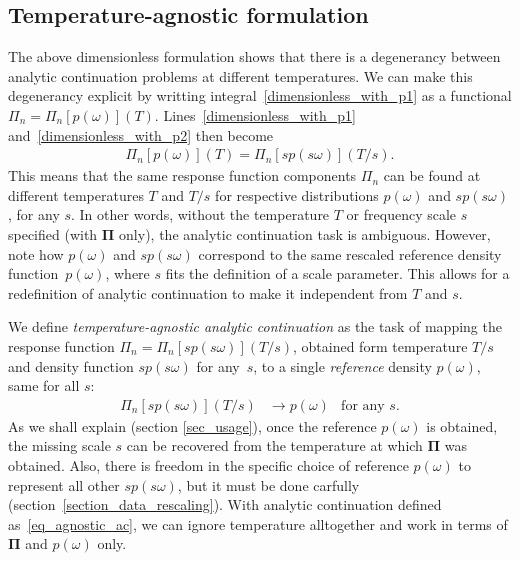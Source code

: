 \documentclass[notitlepage,11pt,nofootinbib]{revtex4-1}
\renewcommand{\vec}[1]{\bm{#1}}
\begin{document}
\subsection{Temperature-agnostic formulation}
\label{section_temperature_agnostic}
The above dimensionless  formulation shows that there is a degenerancy between analytic continuation problems at different temperatures. We can make this degenerancy explicit by writting integral~\eqref{dimensionless_with_p1} as a functional $\Pi_n = \Pi_n[p(\omega)](T)$. Lines~\eqref{dimensionless_with_p1} and~\eqref{dimensionless_with_p2} then become 
\begin{align}
\Pi_n[p(\omega)](T) = \Pi_n[sp(s\omega)](T/s).
\label{degenerancy}
\end{align}
This means that the same response function components $\Pi_n$ can be found at different temperatures $T$ and $T/s$ for respective distributions $p(\omega)$ and $sp(s\omega)$, for any $s$.
In other words, without the temperature $T$ or frequency scale $s$ specified (with $\vec \Pi$ only), the analytic continuation task is ambiguous.
However, note how $p(\omega)$ and $sp(s\omega)$ correspond to the same rescaled reference density function~$p(\omega)$, where $s$ fits the definition of a scale parameter.
This allows for a redefinition of analytic continuation to make it independent from $T$ and $s$.

We define \emph{temperature-agnostic analytic continuation} as the task of mapping the response function $\Pi_n = \Pi_n[sp(s\omega)](T/s)$, obtained form temperature $T/s$ and density function $sp(s\omega)$ for any~$s$, to a single \emph{reference} density $p(\omega)$, same for all $s$:
\begin{align}
    \Pi_n[sp(s\omega)](T/s) &\longrightarrow p(\omega) &\text{for any }s.
    \label{eq_agnostic_ac}
\end{align}
As we shall explain (section \ref{sec_usage}), once the reference $p(\omega)$ is obtained, the missing scale $s$ can be recovered from the temperature at which $\vec \Pi$ was obtained.
Also, there is freedom in the specific choice of reference $p(\omega)$ to represent all other $sp(s\omega)$, but it must be done carfully (section~\ref{section_data_rescaling}).
With analytic continuation defined as~\eqref{eq_agnostic_ac}, we can ignore temperature alltogether and work in terms of $\vec \Pi$ and $p(\omega)$ only.
\end{document}
